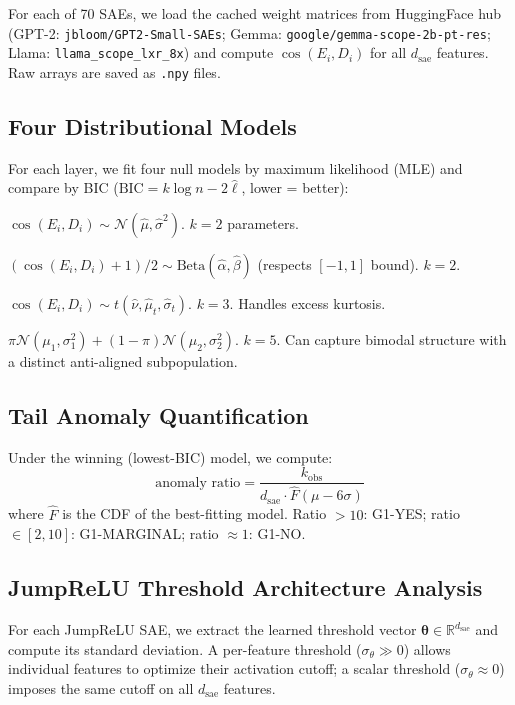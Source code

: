 \documentclass[11pt,a4paper]{article}
\newcommand{\cosED}{\cos(E_i, D_i)}
\begin{document}
For each of 70 SAEs, we load the cached weight matrices from HuggingFace hub (GPT-2: \texttt{jbloom/GPT2-Small-SAEs}; Gemma: \texttt{google/gemma-scope-2b-pt-res}; Llama: \texttt{llama\_scope\_lxr\_8x}) and compute $\cosED$ for all $d_\text{sae}$ features. Raw arrays are saved as \texttt{.npy} files.

\subsection{Four Distributional Models}

For each layer, we fit four null models by maximum likelihood (MLE) and compare by BIC ($\text{BIC} = k\log n - 2\hat\ell$, lower = better):

\begin{description}[nosep, leftmargin=1em]
  \item[Gaussian] $\cosED \sim \mathcal{N}(\hat\mu, \hat\sigma^2)$. $k=2$ parameters.
  \item[Beta (shifted)] $({\cosED+1})/{2} \sim \text{Beta}(\hat\alpha, \hat\beta)$ (respects \mbox{$[-1,1]$} bound). $k=2$.
  \item[Student-$t$] $\cosED \sim t(\hat\nu, \hat\mu_t, \hat\sigma_t)$. $k=3$. Handles excess kurtosis.
  \item[Gaussian Mixture] $\pi\mathcal{N}(\mu_1,\sigma_1^2)+(1-\pi)\mathcal{N}(\mu_2,\sigma_2^2)$. $k=5$. Can capture bimodal structure with a distinct anti-aligned subpopulation.
\end{description}

\subsection{Tail Anomaly Quantification}

Under the winning (lowest-BIC) model, we compute:
\begin{equation}
  \text{anomaly ratio} = \frac{k_\text{obs}}{d_\text{sae} \cdot \hat{F}(\mu - 6\sigma)}
\end{equation}
where $\hat{F}$ is the CDF of the best-fitting model. Ratio $>10$: G1-YES; ratio $\in[2,10]$: G1-MARGINAL; ratio $\approx1$: G1-NO.

\subsection{JumpReLU Threshold Architecture Analysis}

For each JumpReLU SAE, we extract the learned threshold vector $\boldsymbol{\theta} \in \mathbb{R}^{d_\text{sae}}$ and compute its standard deviation. A per-feature threshold ($\sigma_\theta \gg 0$) allows individual features to optimize their activation cutoff; a scalar threshold ($\sigma_\theta \approx 0$) imposes the same cutoff on all $d_\text{sae}$ features.
\end{document}
